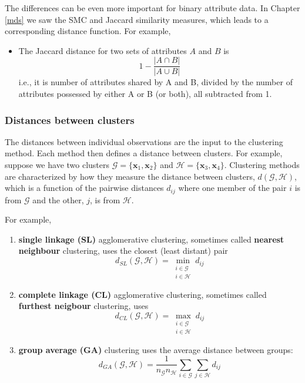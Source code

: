 \documentclass[
]{book}
\providecommand{\tightlist}{%
  \setlength{\itemsep}{0pt}\setlength{\parskip}{0pt}}
\theoremstyle{definition}
\theoremstyle{definition}
\theoremstyle{definition}
\theoremstyle{definition}
\theoremstyle{remark}
\begin{document}
The differences can be even more important for binary attribute data. In Chapter \ref{mds} we saw the SMC and Jaccard similarity measures, which leads to a corresponding distance function. For example,

\begin{itemize}
\tightlist
\item
  The Jaccard distance for two sets of attributes \(A\) and \(B\) is
  \[1- \frac{|A \cap B|}{|A\cup B|}\]
  i.e., it is number of attributes shared by A and B, divided by the number of attributes possessed by either A or B (or both), all subtracted from 1.
\end{itemize}

\hypertarget{distances-between-clusters}{%
\subsubsection{Distances between clusters}\label{distances-between-clusters}}

The distances between individual observations are the input to the clustering method. Each method then defines a distance between clusters. For example, suppose we have two clusters \(\mathcal{G}=\{\mathbf x_1, \mathbf x_2\}\) and \(\mathcal{H}=\{\mathbf x_3, \mathbf x_4\}\). Clustering methods are characterized by how they measure the distance between clusters, \(d(\mathcal{G}, \mathcal{H})\), which is a function of the pairwise distances \(d_{ij}\) where one member of the pair \(i\) is from \(\mathcal{G}\) and the other, \(j\), is from \(\mathcal{H}\).

For example,

\begin{enumerate}
\def\labelenumi{\arabic{enumi}.}
\item
  \textbf{single linkage (SL)} agglomerative clustering, sometimes called \textbf{nearest neighbour} clustering, uses the closest (least distant) pair
  \[d_{SL}(\mathcal{G}, \mathcal{H}) = \min_{\substack{i\in \mathcal{G}\\ i\in \mathcal{H}}} d_{ij}\]
\item
  \textbf{complete linkage (CL)} agglomerative clustering, sometimes called \textbf{furthest neigbour} clustering, uses
  \[d_{CL}(\mathcal{G}, \mathcal{H}) = \max_{\substack{i\in \mathcal{G}\\ i\in \mathcal{H}}} d_{ij}\]
\item
  \textbf{group average (GA)} clustering uses the average distance between groups:
  \[d_{GA}(\mathcal{G}, \mathcal{H}) = \frac{1}{n_\mathcal{G}n_\mathcal{H}}\sum_{i\in\mathcal{G}}\sum_{j\in\mathcal{H}} d_{ij}\]
\end{enumerate}
\end{document}
